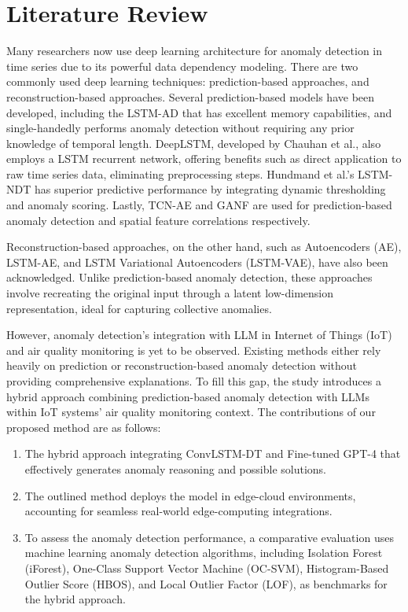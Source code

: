 \documentclass[final,3p,times,twocolumn]{elsarticle}
\begin{document}
\section{Literature Review}\label{sec2}
Many researchers now use deep learning architecture for anomaly detection in time series due to its powerful data dependency modeling. There are two commonly used deep learning techniques: prediction-based approaches, and reconstruction-based approaches. Several prediction-based models have been developed, including the LSTM-AD that has excellent memory capabilities, and single-handedly performs anomaly detection without requiring any prior knowledge of temporal length. DeepLSTM, developed by Chauhan et al., also employs a LSTM recurrent network, offering benefits such as direct application to raw time series data, eliminating preprocessing steps. Hundmand et al.'s LSTM-NDT has superior predictive performance by integrating dynamic thresholding and anomaly scoring. Lastly, TCN-AE and GANF are used for prediction-based anomaly detection and spatial feature correlations respectively. 

Reconstruction-based approaches, on the other hand, such as Autoencoders (AE), LSTM-AE, and LSTM Variational Autoencoders (LSTM-VAE), have also been acknowledged. Unlike prediction-based anomaly detection, these approaches involve recreating the original input through a latent low-dimension representation, ideal for capturing collective anomalies. 

However, anomaly detection's integration with LLM in Internet of Things (IoT) and air quality monitoring is yet to be observed. Existing methods either rely heavily on prediction or reconstruction-based anomaly detection without providing comprehensive explanations. To fill this gap, the study introduces a hybrid approach combining prediction-based anomaly detection with LLMs within IoT systems' air quality monitoring context. 
The contributions of our proposed method are as follows: 
\begin{enumerate}
\item The hybrid approach integrating ConvLSTM-DT and Fine-tuned GPT-4 that effectively generates anomaly reasoning and possible solutions.\item The outlined method deploys the model in edge-cloud environments, accounting for seamless real-world edge-computing integrations.\item To assess the anomaly detection performance, a comparative evaluation uses machine learning anomaly detection algorithms, including Isolation Forest (iForest), One-Class Support Vector Machine (OC-SVM), Histogram-Based Outlier Score (HBOS), and Local Outlier Factor (LOF), as benchmarks for the hybrid approach.
\end{enumerate}
\end{document}
